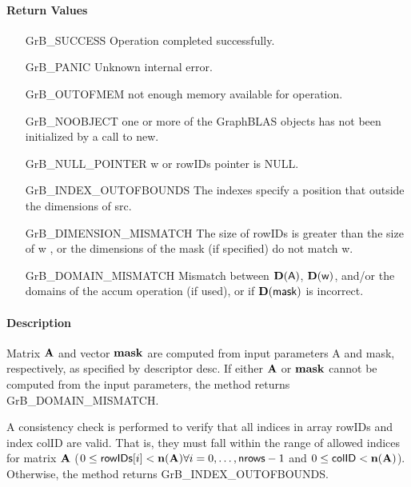 \paragraph{Return Values}

\begin{itemize}[leftmargin=2.1in]
\item[{\sf GrB\_SUCCESS}]             Operation completed successfully.
\item[{\sf GrB\_PANIC}]               Unknown internal error.
\item[{\sf GrB\_OUTOFMEM}]    not enough memory available for operation.
\item[{\sf GrB\_NOOBJECT}]   one or more of the GraphBLAS objects has
                             not been initialized by a call to {\sf new}.
\item[{\sf GrB\_NULL\_POINTER}]    {\sf w} or {\sf rowIDs} pointer is {\sf NULL}.

\item[{\sf GrB\_INDEX\_OUTOFBOUNDS}]  The indexes specify a position that outside the dimensions of src.
\item[{\sf GrB\_DIMENSION\_MISMATCH}] 
       The size of {\sf rowIDs} is greater than the size of {\sf w} , 
       or the dimensions of the mask (if specified) do not match {\sf w}.
\item[{\sf GrB\_DOMAIN\_MISMATCH}]    Mismatch between $\bold{D}(\sf A)$, 
                                      $\bold{D}({\sf w})$, and/or the domains of the 
                                      {\sf accum} operation (if used), or if $\bold{D}(\sf mask)$ is incorrect.
\end{itemize}

\paragraph{Description}

Matrix ${\bf A}$ and vector ${\bf mask}$ are computed from input
parameters {\sf A} and {\sf mask}, respectively, as specified by
descriptor {\sf desc}.  If either ${\bf A}$ or ${\bf mask}$
cannot be computed from the input parameters, the method returns {\sf
GrB\_DOMAIN\_MISMATCH}.

A consistency check is performed to verify that all indices in array
{\sf rowIDs} and index {\sf colID} are valid. That is, they must fall within the range of allowed
indices for matrix ${\bf A}$ ($0 \leq {\sf rowIDs}[i] < \bold{n}({\bf A})
\forall i = 0,\ldots,{\sf nrows}-1$ and
$0 \leq {\sf colID} < \bold{n}({\bf A})$).  Otherwise, the method returns {\sf
GrB\_INDEX\_OUTOFBOUNDS}.

